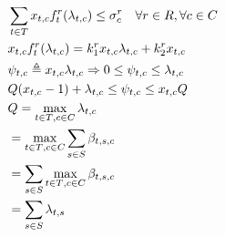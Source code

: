 \documentclass[conference]{IEEEtran}
\begin{document}
    \begin{subequations}
      \begin{align}
        &\sum_{t \in T}x_{t,c}f_t^r(\lambda_{t,c}) \le \sigma_c^r \quad \forall{r \in R}, \forall{c \in C} \\
        &x_{t,c}f_t^r(\lambda_{t,c}) = k_1^rx_{t,c}\lambda_{t,c} + k_2^rx_{t,c} \\
        &\psi_{t,c} \triangleq x_{t,c}\lambda_{t,c} \Rightarrow 0 \leq \psi_{t,c} \leq \lambda_{t,c} \\
        &Q(x_{t,c}-1)+\lambda_{t,c} \leq \psi_{t,c} \leq x_{t,c}Q \\
        &\notag Q = \max_{{t \in T},{c \in C}} \lambda_{t,c} \\
        &\notag =\max_{{t \in T},{c \in C}} \sum_{s \in S}\beta_{t,s,c} \\
        &\notag =\sum_{s\in S} \max_{{t \in T},{c \in C}} \beta_{t,s,c} \\
        &=\sum_{s \in S}\lambda_{t,s}
      \end{align}
    \end{subequations}
\end{document}
